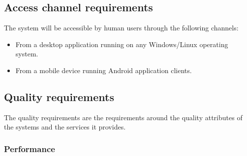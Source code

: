 \documentclass[letterpaper]{article}
\begin{document}
		
		\vspace{0.2in}
		
		\subsection*{Access channel requirements}
		
		\vspace{0.1in}
		
		The system will be accessible by human users through the following channels:
		\begin{itemize}
			\item From a desktop application running on any Windows/Linux operating system.
			\item From a mobile device running Android application clients.
		\end{itemize}
		
		\vspace{0.2in}
		
		\subsection*{Quality requirements}
		
		\vspace{0.1in}
		
		The quality requirements are the requirements around the quality attributes of the systems and the
			services it provides.
			
			\subsubsection*{Performance}
			\vspace{0.1in}
			
\end{document}
